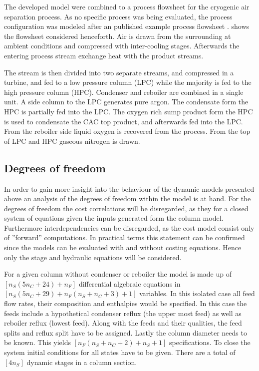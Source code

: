     The developed model were combined to a process flowsheet for the cryogenic air separation process. 
    As no specific process was being evaluated, the process configuration was modeled after an 
    published example process flowsheet . 
    shows the flowsheet considered henceforth. Air is drawn from the surrounding at ambient conditions
    and compressed with inter-cooling stages. Afterwards the entering process stream exchange heat 
    with the product streams. 
    
    The stream is then divided into two separate streams, and compressed in a turbine, and fed to
    a low pressure column (LPC) while the majority is fed to the high pressure column (HPC). 
    Condenser and reboiler are combined in a single unit. A side column to the LPC generates pure 
    argon. The condensate form the HPC is partially fed into the LPC. The oxygen rich sump product form the HPC
    is used to condensate the CAC top product, and afterwards fed into the LPC. From the reboiler side liquid oxygen 
    is recovered from the process. From the top of LPC and HPC gaseous nitrogen is drawn.  
    
    \subsection{Degrees of freedom}
    In order to gain more insight into the behaviour of the dynamic models presented above an analysis
    of the degrees of freedom within the model is at hand. For the degrees of freedom the cost correlations
    will be disregarded, as they for a closed system of equations given the inputs generated form the column
    model. Furthermore interdependencies can be disregarded, as the cost model consist only of ''forward''
    computations. In practical terms this statement can be confirmed since the models can be evaluated
    with and without costing equations. Hence only the stage and hydraulic equations will be considered.

    For a given column without condenser or reboiler the model is made up of $[n_S (5n_C + 24) + n_F]$
    differential algebraic equations in $[n_S (5n_C + 29) + n_F (n_S + n_C + 3) + 1]$ variables. In this
    isolated case all feed flow rates, their composition and enthalpies would be specified. In this case
    the feeds include a hypothetical condenser reflux (the upper most feed) as well as reboiler reflux
    (lowest feed). Along with the feeds and their qualities, the feed splits and reflux split have to be
    assigned. Lastly the column diameter needs to be known. This yields $[n_F (n_S + n_C + 2) + n_S + 1]$
    specifications. To close the system initial conditions for all states have to be given. There
    are a total of $[4 n_S ]$ dynamic stages in a column section.

